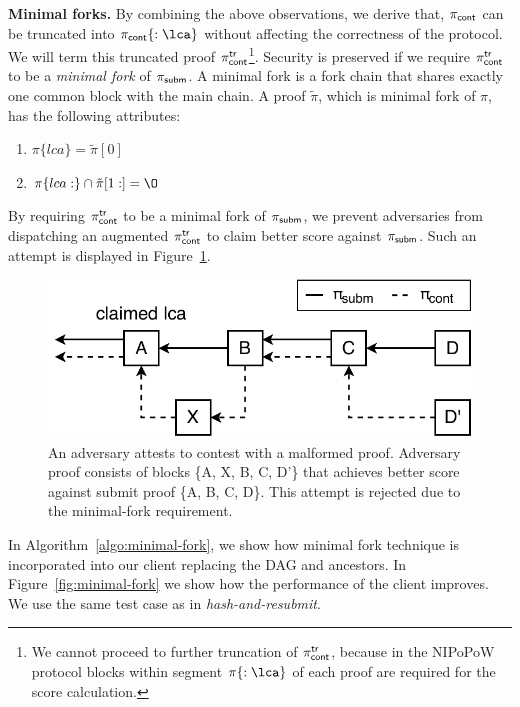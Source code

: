 \noindent \textbf{Minimal forks.} By combining the above observations, we
derive that, $\mathsf{\pi_{cont}}$ can be truncated into $\pic\{:\lca\}$ without
affecting the correctness of the protocol. We will term this truncated proof
$\mathsf{\pi_{cont}^{tr}}$\footnote{We cannot proceed to further truncation of $\mathsf{\pi_{cont}^{tr}}$, because
in the NIPoPoW protocol blocks within segment $\pi\{:\lca\}$ of each proof
are required for the score calculation.}. Security is preserved if we require
$\mathsf{\pi_{cont}^{tr}}$ to be a \emph{minimal fork} of $\mathsf{\pi_{subm}}$. A minimal fork is a fork chain
that shares exactly one common block with the main chain. A proof $\tilde\pi$,
which is minimal fork of $\pi$, has the following attributes:

\begin{enumerate}
\item $\pi\{lca\} = \tilde\pi[0]$
\item $\pi\{lca:\} \cap \tilde\pi[1:] = \O$
\end{enumerate}

By requiring $\mathsf{\pi_{cont}^{tr}}$ to be a minimal fork of $\mathsf{\pi_{subm}}$, we prevent adversaries
from dispatching an augmented $\mathsf{\pi_{cont}^{tr}}$ to claim better score against $\mathsf{\pi_{subm}}$.
Such an attempt is displayed in Figure~\ref{fig:adversary-minimal-fork}.

\begin{figure}[h]
    \begin{center}
        \includegraphics[width=0.7\columnwidth]{figures/adversary-minimal-fork.pdf}
    \end{center}

    \caption{An adversary attests to contest with a malformed proof. Adversary
        proof consists of blocks \{A, X, B, C, D'\} that achieves better score
        against submit proof \{A, B, C, D\}. This attempt is rejected due to
        the minimal-fork requirement.}

    \label{fig:adversary-minimal-fork}
\end{figure}

In Algorithm~\ref{algo:minimal-fork}, we show how minimal fork technique is
incorporated into our client replacing the DAG and ancestors. In
Figure~\ref{fig:minimal-fork} we show how the performance of the client
improves. We use the same test case as in \emph{hash-and-resubmit}.

